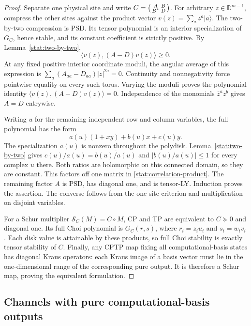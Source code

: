 \documentclass[reqno]{amsart}
\theoremstyle{definition}
\theoremstyle{remark}
\newcommand{\D}{\mathbb D}
\begin{document}
\begin{proof}
Separate one physical site and write
\(C=\begin{psmallmatrix}A&B\\B^*&D\end{psmallmatrix}\).
For arbitrary \(z\in\D^{m-1}\), compress the other sites against
the product vector \(v(z)=\sum_a z^a|a\rangle\).
The two-by-two compression is PSD.  Its tensor polynomial is an
interior specialization of \(G_C\), hence stable, and its
constant coefficient is strictly positive.  By
Lemma~\ref{stat:two-by-two},
\[
 \langle v(z),(A-D)v(z)\rangle\ge0.
\]
At any fixed positive interior coordinate moduli, the angular
average of this expression is
\(\sum_a(A_{aa}-D_{aa})|z|^{2a}=0\).
Continuity and nonnegativity force pointwise equality on every
such torus.  Varying the moduli proves the polynomial identity
\(\langle v(z),(A-D)v(z)\rangle=0\).  Independence of the
monomials \(\bar z^a z^b\) gives \(A=D\) entrywise.

Writing \(u\) for the remaining independent row and column
variables, the full polynomial has the form
\[
 a(u)(1+xy)+b(u)x+c(u)y.
\]
The specialization \(a(u)\) is nonzero throughout the polydisk.
Lemma~\ref{stat:two-by-two} gives
\(c(u)/a(u)=\overline{b(u)/a(u)}\) and
\(|b(u)/a(u)|\le1\) for every complex \(u\) there.
Both ratios are holomorphic on this connected domain, so they
are constant.  This factors off one matrix in
\eqref{stat:correlation-product}.  The remaining factor \(A\)
is PSD, has diagonal one, and is tensor-LY.  Induction proves
the assertion.  The converse follows from the one-site criterion
and multiplication on disjoint variables.

For a Schur multiplier \(\mathcal S_C(M)=C\circ M\), CP and
TP are equivalent to \(C\succeq0\) and diagonal one.  Its full
Choi polynomial is \(G_C(r,s)\), where \(r_i=z_iu_i\) and
\(s_i=w_iv_i\).  Each disk value is attainable by these
products, so full Choi stability is exactly tensor stability
of \(C\).  Finally, any CPTP map fixing all computational-basis
states has diagonal Kraus operators: each Kraus image of a basis
vector must lie in the one-dimensional range of the corresponding
pure output.  It is therefore a Schur map, proving the equivalent
formulation.
\end{proof}

\subsection{Channels with pure computational-basis outputs}
\end{document}
